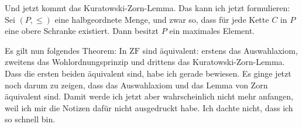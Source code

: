 \begin{math-stroke}

\end{math-stroke}

\begin{spoken-clean}[01:00:40 - 01:02:40]
Und jetzt kommt das Kuratowski-Zorn-Lemma. Das kann ich jetzt formulieren: Sei $(P, \le)$ eine halbgeordnete Menge, und zwar so, dass für jede Kette $C$ in $P$ eine obere Schranke existiert. Dann besitzt $P$ ein maximales Element.
\end{spoken-clean}

\begin{math-stroke}
\end{math-stroke}

\begin{spoken-clean}[01:02:40 - 01:04:40]
Es gilt nun folgendes Theorem: In $\text{ZF}$ sind äquivalent: erstens das Auswahlaxiom, zweitens das Wohlordnungsprinzip und drittens das Kuratowski-Zorn-Lemma. Dass die ersten beiden äquivalent sind, habe ich gerade bewiesen. Es ginge jetzt noch darum zu zeigen, dass das Auswahlaxiom und das Lemma von Zorn äquivalent sind. Damit werde ich jetzt aber wahrscheinlich nicht mehr anfangen, weil ich mir die Notizen dafür nicht ausgedruckt habe. Ich dachte nicht, dass ich so schnell bin.
\end{spoken-clean}

\begin{math-stroke}
\end{math-stroke}

